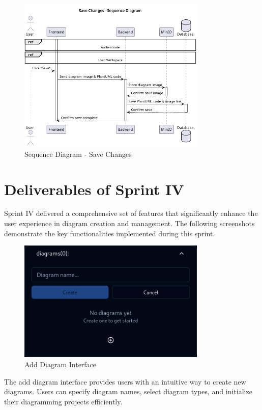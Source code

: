 \begin{figure}[H]
\centering
\includegraphics[width=0.8\textwidth]{conception/SprintIV/sequence_diagrams/sequence_workspaceManagement_save_changes.png}
\caption{Sequence Diagram - Save Changes}
\end{figure}

\section{Deliverables of Sprint IV}

Sprint IV delivered a comprehensive set of features that significantly enhance the user experience in diagram creation and management. The following screenshots demonstrate the key functionalities implemented during this sprint.

\begin{figure}[H]
\centering
\includegraphics[width=0.8\textwidth]{screenshots/add-diagram.png}
\caption{Add Diagram Interface}
\end{figure}

The add diagram interface provides users with an intuitive way to create new diagrams. Users can specify diagram names, select diagram types, and initialize their diagramming projects efficiently.

